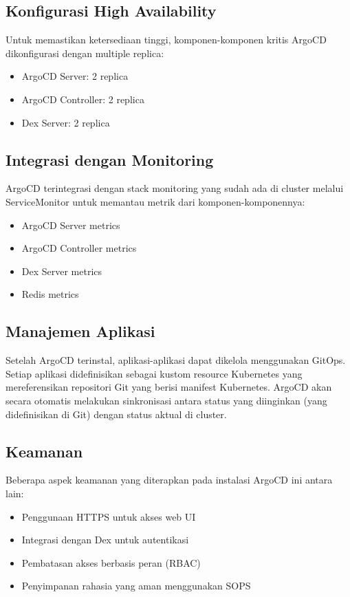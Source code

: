 \subsection{Konfigurasi High Availability}
Untuk memastikan ketersediaan tinggi, komponen-komponen kritis ArgoCD dikonfigurasi dengan multiple replica:

\begin{itemize}
    \item ArgoCD Server: 2 replica
    \item ArgoCD Controller: 2 replica
    \item Dex Server: 2 replica
\end{itemize}

\subsection{Integrasi dengan Monitoring}
ArgoCD terintegrasi dengan stack monitoring yang sudah ada di cluster melalui ServiceMonitor untuk memantau metrik dari komponen-komponennya:

\begin{itemize}
    \item ArgoCD Server metrics
    \item ArgoCD Controller metrics
    \item Dex Server metrics
    \item Redis metrics
\end{itemize}

\subsection{Manajemen Aplikasi}
Setelah ArgoCD terinstal, aplikasi-aplikasi dapat dikelola menggunakan GitOps. Setiap aplikasi didefinisikan sebagai kustom resource Kubernetes yang mereferensikan repositori Git yang berisi manifest Kubernetes. ArgoCD akan secara otomatis melakukan sinkronisasi antara status yang diinginkan (yang didefinisikan di Git) dengan status aktual di cluster.

\subsection{Keamanan}
Beberapa aspek keamanan yang diterapkan pada instalasi ArgoCD ini antara lain:

\begin{itemize}
    \item Penggunaan HTTPS untuk akses web UI
    \item Integrasi dengan Dex untuk autentikasi
    \item Pembatasan akses berbasis peran (RBAC)
    \item Penyimpanan rahasia yang aman menggunakan SOPS
\end{itemize}

